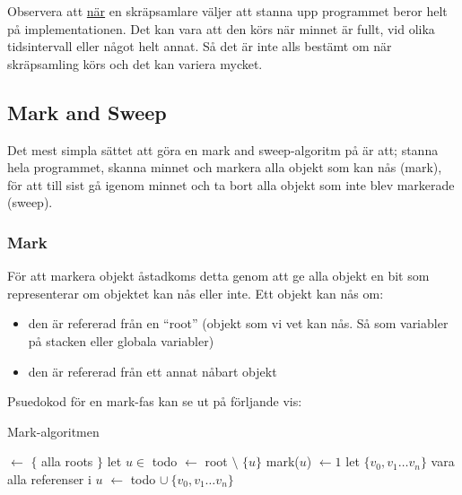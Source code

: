 \documentclass[12pt,a4paper]{article}
\newcommand{\var}[1]{{\ttfamily#1}}%
\begin{document}
Observera att \underline{när} en skräpsamlare väljer att stanna upp
programmet beror helt på implementationen. Det kan vara att den körs
när minnet är fullt, vid olika tidsintervall eller något helt annat.
Så det är inte alls bestämt om när skräpsamling körs och det kan variera
mycket.

\subsection{Mark and Sweep}
\label{subsec:marksweep}

Det mest simpla sättet att göra en mark and sweep-algoritm på är att;
stanna hela programmet, skanna minnet och markera alla objekt som kan
nås (mark), för att till sist gå igenom minnet och ta bort alla objekt
som inte blev markerade (sweep).

\subsubsection{Mark}
\label{subsec:mark}

För att markera objekt åstadkoms detta genom att ge alla objekt en bit
som representerar om objektet kan nås eller inte. Ett objekt kan nås
om:

\begin{itemize}
  \item den är refererad från en ``root'' (objekt som vi vet kan nås. Så som variabler på stacken eller globala variabler)
  \item den är refererad från ett annat nåbart objekt
\end{itemize}

\bigskip

Psuedokod för en mark-fas kan se ut på förljande vis:

\begin{algorithm}[H]
  \caption{Mark-algoritmen}\label{markalg}
  \begin{algorithmic}[1]
    \State \var{todo} $\gets$ $\{$ alla roots $\}$ 
    \While{\var{todo} $\not= \emptyset$}
      \State let $u \in$ \var{todo}
      \State \var{root} $\gets$ \var{root} $\setminus$ $\{u\}$
        \State mark($u$) $\gets 1$
        \State let $\{v_0, v_1 \ldots v_n \}$ vara alla referenser i $u$
        \State \var{todo} $\gets$ \var{todo} $\cup \ \{v_0, v_1 \ldots v_n \}$
        \EndIf
    \EndWhile\label{euclidendwhile}
  \end{algorithmic}
\end{algorithm}
\end{document}
